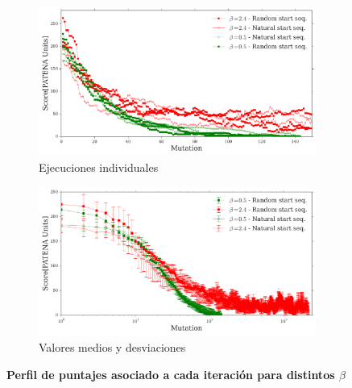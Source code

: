 \begin{figure}[htbp]
  \begin{subfigure}[b]{\textwidth}
 \includegraphics[width=\textwidth]{img/resultados/iterationVsScore-individual.png}
    \caption{Ejecuciones individuales}
    \label{fig:scoreVsiter-a}
  \end{subfigure}
  \begin{subfigure}[b]{\textwidth}
     \includegraphics[width=\textwidth]{img/resultados/iterationVsScore-mean.png}
    \caption{Valores medios y desviaciones}
  \label{fig:scoreVsiter-b}
  \end{subfigure}
  \caption{\textbf{Perfil de puntajes asociado a cada iteración para distintos $\beta$}}
  \label{fig:scoreVsiter}
\end{figure}






